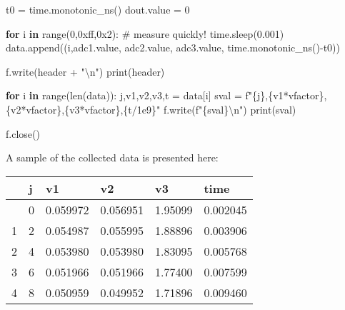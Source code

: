 \documentclass[
  letterpaper,
  DIV=11,
  numbers=noendperiod]{scrartcl}
\newenvironment{Shaded}{\begin{snugshade}}{\end{snugshade}}
\newcommand{\BaseNTok}[1]{\textcolor[rgb]{0.68,0.00,0.00}{#1}}
\newcommand{\BuiltInTok}[1]{\textcolor[rgb]{0.00,0.23,0.31}{#1}}
\newcommand{\CharTok}[1]{\textcolor[rgb]{0.13,0.47,0.30}{#1}}
\newcommand{\CommentTok}[1]{\textcolor[rgb]{0.37,0.37,0.37}{#1}}
\newcommand{\ControlFlowTok}[1]{\textcolor[rgb]{0.00,0.23,0.31}{\textbf{#1}}}
\newcommand{\DecValTok}[1]{\textcolor[rgb]{0.68,0.00,0.00}{#1}}
\newcommand{\FloatTok}[1]{\textcolor[rgb]{0.68,0.00,0.00}{#1}}
\newcommand{\KeywordTok}[1]{\textcolor[rgb]{0.00,0.23,0.31}{\textbf{#1}}}
\newcommand{\NormalTok}[1]{\textcolor[rgb]{0.00,0.23,0.31}{#1}}
\newcommand{\OperatorTok}[1]{\textcolor[rgb]{0.37,0.37,0.37}{#1}}
\newcommand{\SpecialCharTok}[1]{\textcolor[rgb]{0.37,0.37,0.37}{#1}}
\newcommand{\SpecialStringTok}[1]{\textcolor[rgb]{0.13,0.47,0.30}{#1}}
\newcommand{\StringTok}[1]{\textcolor[rgb]{0.13,0.47,0.30}{#1}}
\begin{document}
\begin{Shaded}
\begin{Highlighting}[]
\NormalTok{t0 }\OperatorTok{=}\NormalTok{ time.monotonic\_ns()}
\NormalTok{dout.value }\OperatorTok{=} \DecValTok{0}

\ControlFlowTok{for}\NormalTok{ i }\KeywordTok{in} \BuiltInTok{range}\NormalTok{(}\DecValTok{0}\NormalTok{,}\BaseNTok{0xff}\NormalTok{,}\BaseNTok{0x2}\NormalTok{): }\CommentTok{\# measure quickly!}
\NormalTok{    time.sleep(}\FloatTok{0.001}\NormalTok{)}
\NormalTok{    data.append((i,adc1.value, adc2.value, adc3.value, time.monotonic\_ns()}\OperatorTok{{-}}\NormalTok{t0))}

\NormalTok{f.write(header }\OperatorTok{+} \StringTok{"}\CharTok{\textbackslash{}n}\StringTok{"}\NormalTok{)}
\BuiltInTok{print}\NormalTok{(header)}

\ControlFlowTok{for}\NormalTok{ i }\KeywordTok{in} \BuiltInTok{range}\NormalTok{(}\BuiltInTok{len}\NormalTok{(data)):}
\NormalTok{    j,v1,v2,v3,t }\OperatorTok{=}\NormalTok{ data[i]}
\NormalTok{    sval }\OperatorTok{=} \SpecialStringTok{f"}\SpecialCharTok{\{}\NormalTok{j}\SpecialCharTok{\}}\SpecialStringTok{,}\SpecialCharTok{\{}\NormalTok{v1}\OperatorTok{*}\NormalTok{vfactor}\SpecialCharTok{\}}\SpecialStringTok{,}\SpecialCharTok{\{}\NormalTok{v2}\OperatorTok{*}\NormalTok{vfactor}\SpecialCharTok{\}}\SpecialStringTok{,}\SpecialCharTok{\{}\NormalTok{v3}\OperatorTok{*}\NormalTok{vfactor}\SpecialCharTok{\}}\SpecialStringTok{,}\SpecialCharTok{\{}\NormalTok{t}\OperatorTok{/}\FloatTok{1e9}\SpecialCharTok{\}}\SpecialStringTok{"}
\NormalTok{    f.write(}\SpecialStringTok{f"}\SpecialCharTok{\{}\NormalTok{sval}\SpecialCharTok{\}}\CharTok{\textbackslash{}n}\SpecialStringTok{"}\NormalTok{)}
    \BuiltInTok{print}\NormalTok{(sval)}
    
\NormalTok{f.close()}
\end{Highlighting}
\end{Shaded}

A sample of the collected data is presented here:

\begin{longtable}[]{@{}llllll@{}}
\toprule\noalign{}
& j & v1 & v2 & v3 & time \\
\midrule\noalign{}
\endhead
\bottomrule\noalign{}
\endlastfoot
0 & 0 & 0.059972 & 0.056951 & 1.95099 & 0.002045 \\
1 & 2 & 0.054987 & 0.055995 & 1.88896 & 0.003906 \\
2 & 4 & 0.053980 & 0.053980 & 1.83095 & 0.005768 \\
3 & 6 & 0.051966 & 0.051966 & 1.77400 & 0.007599 \\
4 & 8 & 0.050959 & 0.049952 & 1.71896 & 0.009460 \\
\end{longtable}
\end{document}

